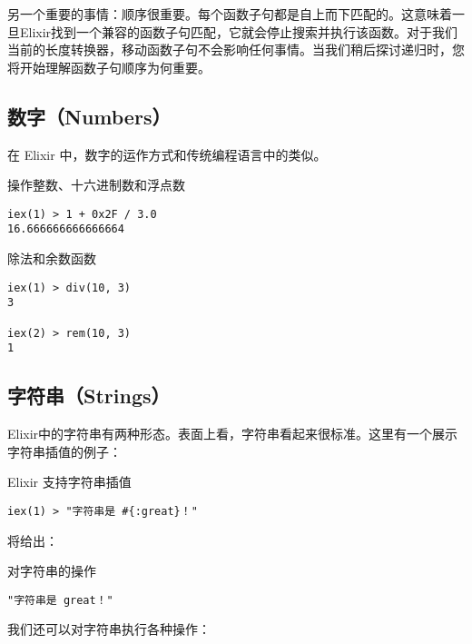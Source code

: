 另一个重要的事情：顺序很重要。每个函数子句都是自上而下匹配的。这意味着一旦Elixir找到一个兼容的函数子句匹配，它就会停止搜索并执行该函数。对于我们当前的长度转换器，移动函数子句不会影响任何事情。当我们稍后探讨递归时，您将开始理解函数子句顺序为何重要。

\subsection{数字（Numbers）}

在 Elixir 中，数字的运作方式和传统编程语言中的类似。

\begin{code}{操作整数、十六进制数和浮点数}
\begin{verbatim}
iex(1) > 1 + 0x2F / 3.0
16.666666666666664
\end{verbatim}
\label{lst:operating_on_integers_hexadecimal_numbers_and_floats}
\end{code}

\begin{code}{除法和余数函数}
\begin{verbatim}
iex(1) > div(10, 3)
3

iex(2) > rem(10, 3)
1
\end{verbatim}
\label{lst:dif_and_rem_functions}
\end{code}

\subsection{字符串（Strings）}

Elixir中的字符串有两种形态。表面上看，字符串看起来很标准。这里有一个展示字符串插值的例子：

\begin{code}{Elixir 支持字符串插值}
\begin{verbatim}
iex(1) > "字符串是 #{:great}！"
\end{verbatim}
\label{lst:elixir_supports_string_interpolation}
\end{code}

将给出：

\begin{code}{对字符串的操作}
\begin{verbatim}
"字符串是 great！"
\end{verbatim}
\end{code}

我们还可以对字符串执行各种操作：

